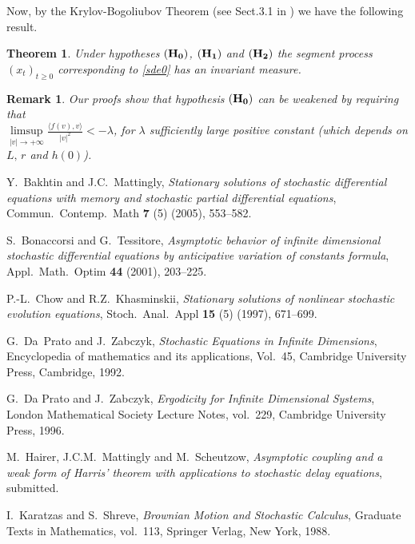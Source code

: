 \documentclass[11pt,reqno,draft]{amsart}
\newtheorem{rem}[defi]{Remark}
\newtheorem{theorem}[defi]{Theorem}
\begin{document}
\noindent Now, by the Krylov-Bogoliubov Theorem (see Sect.3.1 in
\cite{DaZa:96}) we have the following result.
\begin{theorem}
Under hypotheses ${\bf(H_0)}$,  ${\bf(H_1)}$ and  ${\bf(H_2)}$ the
segment process $(x_t)_{t\geq 0}$ corresponding to \eqref{sde0} has
an invariant measure.
\end{theorem}
\begin{rem}
Our proofs show that hypothesis ${\bf (H_0)} $ can be weakened by
requiring that\\ $\limsup\limits_{|v|\to +\infty}\frac{{\langle}
f(v),v{\rangle}}{|v|^2}<-\lambda$, for $\lambda$ sufficiently large
positive constant (which depends on $L,\,r$ and $h(0)$).
\end{rem}
\begin{thebibliography}{99}

 Y.\ Bakhtin and J.C.\ Mattingly, {\it Stationary solutions of stochastic differential equations with memory and stochastic partial differential equations}, Commun.\ Contemp.\ Math \textbf{7} (5) (2005), 553--582.

 S.\ Bonaccorsi and G.\ Tessitore, {\it Asymptotic behavior of infinite dimensional stochastic differential equations by anticipative variation of constants formula}, Appl.\ Math.\ Optim \textbf{44} (2001), 203--225.

 P.-L.\ Chow and R.Z.\ Khasminskii, {\it Stationary solutions of nonlinear stochastic evolution equations}, Stoch.\ Anal.\ Appl \textbf{15} (5) (1997), 671--699.

 G.\ Da\ Prato and J.\ Zabczyk,
\emph{Stochastic Equations in Infinite Dimensions}, Encyclopedia of
mathematics and its applications, Vol.\ 45, Cambridge University
Press, Cambridge, 1992.

G.~Da Prato and J.~Zabczyk,
\newblock \textit{{E}rgodicity for {I}nfinite {D}imensional   {S}ystems},
\newblock London Mathematical Society Lecture Notes, vol.~229, Cambridge University Press, 1996.

 M.\ Hairer, J.C.M.\ Mattingly and M.\ Scheutzow, {\it Asymptotic coupling and a weak form of Harris' theorem with applications to stochastic delay equations}, submitted.

I.~Karatzas and S.~Shreve,
\newblock \textit{Brownian Motion and Stochastic Calculus},
\newblock Graduate Texts in Mathematics, vol.~113, Springer Verlag, New York, 1988.


\end{thebibliography}
\end{document}

